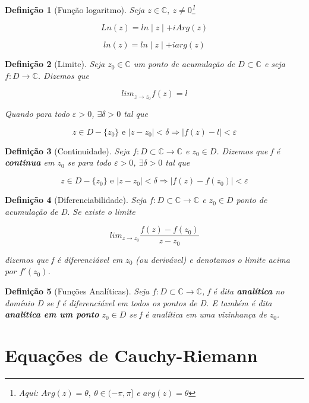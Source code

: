 \documentclass{article}
\newtheorem{definition}{Definição}
\begin{document}
\begin{definition}[Função logaritmo]
Seja $z \in \mathbb{C},\ z \neq 0$\footnote{Aqui: $Arg(z) = \theta,\ \theta \in (-\pi,\pi]$ e $arg(z) = \theta$}

$$Ln(z) = ln \mid z \mid + i Arg(z)$$

$$ln(z) = ln \mid z \mid + i arg(z)$$
\end{definition}

\begin{definition}[Limite]
Seja $z_0 \in \mathbb{C}$ um ponto de acumulação de $D \subset \mathbb{C}$ e seja $f: D \rightarrow \mathbb{C}$. Dizemos que

$$lim_{z \rightarrow z_0} f(z) = l$$

Quando para todo $\varepsilon > 0$, $\exists \delta > 0$ tal que 

$$z \in D - \{z_0\} \text{ e } | z - z_0| < \delta \Longrightarrow{} | f(z) - l | < \varepsilon$$
\end{definition}

\begin{definition}[Continuidade]
Seja $f: D \subset \mathbb{C} \rightarrow \mathbb{C}$ e $z_0 \in D$. Dizemos que f é \textbf{contínua} em $z_0$ se para todo $\varepsilon > 0$, $\exists \delta > 0$ tal que

$$z \in D - \{z_0\} \text{ e } | z - z_0 | < \delta \Longrightarrow{} | f(z) - f(z_0) | < \varepsilon$$
\end{definition}

\begin{definition}[Diferenciabilidade]
Seja $f: D \subset \mathbb{C} \rightarrow \mathbb{C}$ e $z_0 \in D$ ponto de acumulação de D. Se existe o limite

$$lim_{z \rightarrow z_0} \frac{f(z) - f(z_0)}{z - z_0}$$

dizemos que f é diferenciável em $z_0$ (ou derivável) e denotamos o limite acima por $f'(z_0)$.
\end{definition}

\begin{definition}[Funções Analíticas]
Seja $f: D \subset \mathbb{C} \rightarrow \mathbb{C}$, f é dita \textbf{analítica} no domínio D se f é diferenciável em todos os pontos de D. E também é dita \textbf{analítica em um ponto} $z_0 \in D$ se f é analítica em uma vizinhança de $z_0$.
\end{definition}


\section*{Equações de Cauchy-Riemann}
\label{s3}
\end{document}
